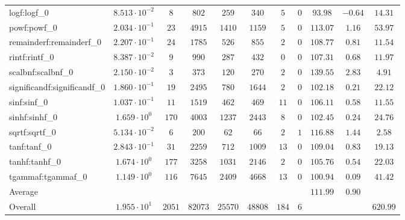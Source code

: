 \begin{tabular}{|l|c|c|c|c|c|c|c|c|c|c|}
logf:logf\_0                 & $ 8.513 \cdot 10^{-2} $ & $ 8      $ & $ 802   $ & $ 259   $ & $ 340   $ & $ 5   $ & $ 0 $ & $ 93.98       $ & $ -0.64   $ & $ 14.31   $ \\
powf:powf\_0                 & $ 2.034 \cdot 10^{-1} $ & $ 23     $ & $ 4915  $ & $ 1410  $ & $ 1159  $ & $ 5   $ & $ 0 $ & $ 113.07      $ & $ 1.16    $ & $ 53.97   $ \\
remainderf:remainderf\_0     & $ 2.207 \cdot 10^{-1} $ & $ 24     $ & $ 1785  $ & $ 526   $ & $ 855   $ & $ 2   $ & $ 0 $ & $ 108.77      $ & $ 0.81    $ & $ 11.54   $ \\
rintf:rintf\_0               & $ 8.387 \cdot 10^{-2} $ & $ 9      $ & $ 990   $ & $ 287   $ & $ 432   $ & $ 0   $ & $ 0 $ & $ 107.31      $ & $ 0.68    $ & $ 11.97   $ \\
scalbnf:scalbnf\_0           & $ 2.150 \cdot 10^{-2} $ & $ 3      $ & $ 373   $ & $ 120   $ & $ 270   $ & $ 2   $ & $ 0 $ & $ 139.55      $ & $ 2.83    $ & $ 4.91    $ \\
significandf:significandf\_0 & $ 1.860 \cdot 10^{-1} $ & $ 19     $ & $ 2495  $ & $ 780   $ & $ 1644  $ & $ 2   $ & $ 0 $ & $ 102.18      $ & $ 0.21    $ & $ 22.12   $ \\
sinf:sinf\_0                 & $ 1.037 \cdot 10^{-1} $ & $ 11     $ & $ 1519  $ & $ 462   $ & $ 469   $ & $ 11  $ & $ 0 $ & $ 106.11      $ & $ 0.58    $ & $ 11.55   $ \\
sinhf:sinhf\_0               & $ 1.659 \cdot 10^{0}  $ & $ 170    $ & $ 4003  $ & $ 1237  $ & $ 2443  $ & $ 8   $ & $ 0 $ & $ 102.45      $ & $ 0.24    $ & $ 24.76   $ \\
sqrtf:sqrtf\_0               & $ 5.134 \cdot 10^{-2} $ & $ 6      $ & $ 200   $ & $ 62    $ & $ 66    $ & $ 2   $ & $ 1 $ & $ 116.88      $ & $ 1.44    $ & $ 2.58    $ \\
tanf:tanf\_0                 & $ 2.843 \cdot 10^{-1} $ & $ 31     $ & $ 2259  $ & $ 712   $ & $ 1009  $ & $ 13  $ & $ 0 $ & $ 109.04      $ & $ 0.83    $ & $ 19.13   $ \\
tanhf:tanhf\_0               & $ 1.674 \cdot 10^{0}  $ & $ 177    $ & $ 3258  $ & $ 1031  $ & $ 2146  $ & $ 2   $ & $ 0 $ & $ 105.76      $ & $ 0.54    $ & $ 22.03   $ \\
tgammaf:tgammaf\_0           & $ 1.149 \cdot 10^{0}  $ & $ 116    $ & $ 7645  $ & $ 2409  $ & $ 4668  $ & $ 13  $ & $ 0 $ & $ 100.94      $ & $ 0.09    $ & $ 41.42   $ \\
\hline
Average                      & $                     $ & $        $ & $       $ & $       $ & $       $ & $     $ & $   $ & $ 111.99      $ & $ 0.90    $ & $         $ \\
\hline
Overall                      & $ 1.955 \cdot 10^{1}  $ & $ 2051   $ & $ 82073 $ & $ 25570 $ & $ 48808 $ & $ 184 $ & $ 6 $ & $             $ & $         $ & $ 620.99  $ \\
\hline
\end{tabular}
